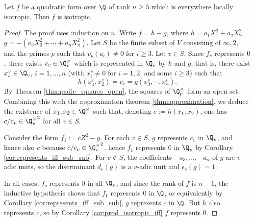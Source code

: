 \begin{lemma}\label{lem:isotr_of_five_le_rk}
\leanok
Let $f$ be a quadratic form over $\Q$ of rank $n \ge 5$ which is everywhere locally isotropic. Then $f$ is isotropic.
\end{lemma}
\begin{proof}
The proof uses induction on $n$. Write $f = h - g$, where $h = a_1X_1^2 + a_2X_2^2$, $g = -(a_3X_3^2 + \cdots + a_nX_n^2)$.
Let $S$ be the finite subset of $V$ consisting of $\infty, 2$, and the primes $p$ such that $v_p(a_i) \ne 0$ for $i \ge 3$.
Let $v \in S$. Since $f_v$ represents $0$, there exists $c_v \in \Q_v^\times$ which is represented in $\Q_v$ by $h$ and $g$, that is, there exist $x_i^v \in \Q_v$, $i=1, \dots, n$ (with $x_i^v \ne 0$ for $i=1, 2$, and some $i \ge 3$) such that
\[ h(x_1^v, x_2^v) = c_v = g(x_3^v, \cdots, x_n^v).\]
By  Theorem \ref{thm:padic_squares_open}, the squares of $\Q_p^\times$ form an open set. Combining this with the approximation theorem \ref{thm:approximation}, we deduce the existence of $x_1, x_2 \in \Q^\times$ such that, denoting $c := h(x_1, x_2)$, one has $c/c_v \in {\Q_v^\times}^2$ for all $v \in S$.

Consider the form $f_1 := cZ^2 - g$. For each $v \in S$, $g$ represents $c_v$ in $\Q_v$, and hence also $c$ because $c/c_v \in {\Q_v^\times}^2$, hence $f_1$ represents $0$ in $\Q_v$ by Corollary \ref{cor:represents_iff_sub_sub}. For $v \notin S$, the coefficients $-a_3, \dots, -a_n$ of $g$ are $v$-adic units, so the discriminant $d_v(g)$ is a $v$-adic unit and $\epsilon_v(g)=1$.

In all cases, $f_q$ represents $0$ in all $\Q_v$, and since the rank of $f$ is $n-1$, the inductive hypothesis shows that $f_1$ represents $0$ in $\Q$, or equivalently by Corollary \ref{cor:represents_iff_sub_sub}, $g$ represents $c$ in $\Q$. But $h$ also represents $c$, so  by Corollary \ref{cor:prod_isotropic_iff} $f$ represents $0$.

\end{proof}
